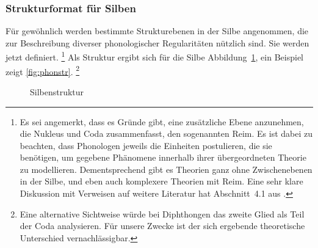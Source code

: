 
\subsubsection{Strukturformat für Silben}

\label{sec:silbenstruktur}

Für gewöhnlich werden bestimmte Strukturebenen in der Silbe angenommen, die zur Beschreibung diverser phonologischer Regularitäten nützlich sind.
Sie werden jetzt definiert.%
\footnote{Es sei angemerkt, dass es Gründe gibt, eine zusätzliche Ebene anzunehmen, die Nukleus und Coda zusammenfasst, den sogenannten Reim.
Es ist dabei zu beachten, dass Phonologen jeweils die Einheiten postulieren, die sie benötigen, um gegebene Phänomene innerhalb ihrer übergeordneten Theorie zu modellieren.
Dementsprechend gibt es Theorien ganz ohne Zwischenebenen in der Silbe, und eben auch komplexere Theorien mit Reim.
Eine sehr klare Diskussion mit Verweisen auf weitere Literatur hat Abschnitt~4.1 aus \citet{Eisenberg1}.}
Als Struktur ergibt sich für die Silbe Abbildung~\ref{fig:silbenstruktur}, ein Beispiel zeigt \ref{fig:phonstr}.%
\footnote{Eine alternative Sichtweise würde bei Diphthongen das zweite Glied als Teil der Coda analysieren.
Für unsere Zwecke ist der sich ergebende theoretische Unterschied vernachlässigbar.
}




\begin{figure}[!h]
  \centering
  \caption{Silbenstruktur}
  \label{fig:silbenstruktur}
\end{figure}

